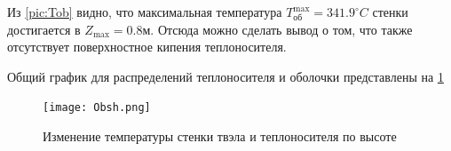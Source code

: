  Из \ref{pic:Tob} 
 видно, что максимальная температура $T_{\text{об}}^{\max} = 341.9 ^\circ C $ стенки достигается в $Z_{\max} = 0.8 м$. Отсюда можно сделать вывод о том, что также отсутствует поверхностное кипения теплоносителя.

Общий график для распределений теплоносителя и оболочки представлены на \ref{pic:obsh}

\begin{figure}[H]
	\begin{center}
		\texttt{[image: Obsh.png]}
		\caption{Изменение температуры стенки твэла и теплоносителя по высоте}
		\label{pic:obsh} %
	\end{center}
\end{figure}
    

